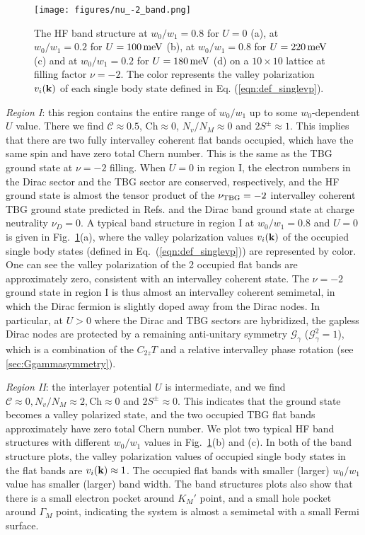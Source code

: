 \documentclass[prb,aps,nofootinbib,amssymb,twocolumn,superscriptaddress,10pt]{revtex4-2}
\begin{document}
\begin{figure*}[!htbp]
	\centering
	\texttt{[image: figures/nu\_-2\_band.png]}
	\caption{The HF band structure at $w_0/w_1 = 0.8$ for $U = 0$ (a), at $w_0/w_1 = 0.2$ for $U=100\,\rm meV$ (b), at $w_0/w_1=0.8$ for $U=220\rm\,meV$ (c) and at $w_0/w_1 = 0.2$ for $U = 180\,\rm meV$ (d) on a $10\times 10$ lattice at filling factor $\nu=-2$. The color represents the valley polarization $v_i(\mathbf{k})$ of each single body state defined in Eq. (\ref{eqn:def_singlevp}).}
	\label{fig:nu_-2_band}
\end{figure*}


{\it Region I}: this region contains the entire range of $w_0/w_1$ up to some $w_0$-dependent $U$ value. There we find $\mathcal{C}\approx 0.5$, $\mathrm{Ch}\approx 0$, $N_v/N_M\approx 0$ and $2S^\pm \approx 1$. This implies that there are two fully intervalley coherent flat bands occupied, which have the same spin and have zero total Chern number. This is the same as the TBG ground state at $\nu=-2$ filling. When $U=0$ in region I, the electron numbers in the Dirac sector and the TBG sector are conserved, respectively, and the HF ground state is almost the tensor product of the $\nu_{\rm TBG}=-2$ intervalley coherent TBG ground state predicted in Refs. \cite{KAN18,BUL20,ZHA20,LIA20,XIE20a} and the Dirac band ground state at charge neutrality $\nu_D=0$. A typical band structure in region I at $w_0/w_1=0.8$ and $U=0$ is given in Fig.~\ref{fig:nu_-2_band}(a), where the valley polarization values $v_i(\mathbf{k})$ of the occupied single body states (defined in Eq.~(\ref{eqn:def_singlevp})) are represented by color. One can see the valley polarization of the 2 occupied flat bands are approximately zero, consistent with an intervalley coherent state. The $\nu=-2$ ground state in region I is thus almost an intervalley coherent semimetal, in which the Dirac fermion is slightly doped away from the Dirac nodes. In particular, at $U>0$ where the Dirac and TBG sectors are hybridized, the gapless Dirac nodes are protected by a remaining anti-unitary symmetry $\mathcal{G}_\gamma$ ($\mathcal{G}_\gamma^2=1$), which is a combination of the $C_{2z}T$ and a relative intervalley phase rotation (see \ref{sec:Ggammasymmetry}).


{\it Region II}: the interlayer potential $U$ is intermediate, and we find $\mathcal{C}\approx 0, N_v/N_M \approx 2, \mathrm{Ch}\approx 0$ and $2S^\pm \approx 0$. This indicates that the ground state becomes a valley polarized state, and the two occupied TBG flat bands approximately have zero total Chern number.
We plot two typical HF band structures with different $w_0/w_1$ values in Fig.~\ref{fig:nu_-2_band}(b) and (c). In both of the band structure plots, the valley polarization values of occupied single body states in the flat bands are $v_i(\mathbf{k})\approx 1$. The occupied flat bands with smaller (larger) $w_0/w_1$ value has smaller (larger) band width. The band structures plots also show that there is a small electron pocket around $K_M'$ point, and a small hole pocket around $\Gamma_M$ point, indicating the system is almost a semimetal with a small Fermi surface.
\end{document}
